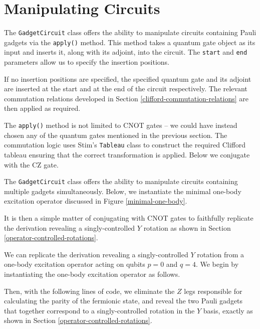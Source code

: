 \section{Manipulating Circuits}%
\label{manipulating-circuits}

The \lstinline{GadgetCircuit} class offers the ability to manipulate circuits containing Pauli gadgets via the \lstinline{apply()} method. This method takes a quantum gate object as its input and inserts it, along with its adjoint, into the circuit. The \lstinline{start} and \lstinline{end} parameters allow us to specify the insertion positions.


If no insertion positions are specified, the specified quantum gate and its adjoint are inserted at the start and at the end of the circuit respectively. The relevant commutation relations developed in Section \ref{clifford-commutation-relations} are then applied as required.


The \lstinline{apply()} method is not limited to CNOT gates -- we could have instead chosen any of the quantum gates mentioned in the previous section. The commutation logic uses Stim's \lstinline{Tableau} class to construct the required Clifford tableau ensuring that the correct transformation is applied. Below we conjugate with the CZ gate.


The \lstinline{GadgetCircuit} class offers the ability to manipulate circuits containing multiple gadgets simultaneously. Below, we instantiate the minimal one-body excitation operator discussed in Figure \ref{minimal-one-body}.


It is then a simple matter of conjugating with CNOT gates to faithfully replicate the derivation revealing a singly-controlled $Y$ rotation as shown in Section \ref{operator-controlled-rotations}.


We can replicate the derivation revealing a singly-controlled $Y$ rotation from a one-body excitation operator acting on qubits $p=0$ and $q=4$. We begin by instantiating the one-body excitation operator as follows.


Then, with the following lines of code, we eliminate the $Z$ legs responsible for calculating the parity of the fermionic state, and reveal the two Pauli gadgets that together correspond to a singly-controlled rotation in the $Y$ basis, exactly as shown in Section \ref{operator-controlled-rotations}.

